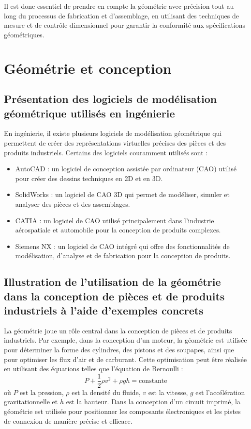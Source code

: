 \documentclass{article}
\begin{document}
Il est donc essentiel de prendre en compte la géométrie avec précision tout au long du processus de fabrication et d'assemblage, en utilisant des techniques de mesure et de contrôle dimensionnel pour garantir la conformité aux spécifications géométriques.




\section{Géométrie et conception}

\subsection{Présentation des logiciels de modélisation géométrique utilisés en ingénierie}
En ingénierie, il existe plusieurs logiciels de modélisation géométrique qui permettent de créer des représentations virtuelles précises des pièces et des produits industriels. Certains des logiciels couramment utilisés sont : 
\begin{itemize}

  \item AutoCAD : un logiciel de conception assistée par ordinateur (CAO) utilisé pour créer des dessins techniques en 2D et en 3D.

  \item SolidWorks : un logiciel de CAO 3D qui permet de modéliser, simuler et analyser des pièces et des assemblages.

  \item CATIA : un logiciel de CAO utilisé principalement dans l'industrie aérospatiale et automobile pour la conception de produits complexes.

  \item Siemens NX : un logiciel de CAO intégré qui offre des fonctionnalités de modélisation, d'analyse et de fabrication pour la conception de produits.
\end{itemize}

\subsection{Illustration de l'utilisation de la géométrie dans la conception de pièces et de produits industriels à l'aide d'exemples concrets}
La géométrie joue un rôle central dans la conception de pièces et de produits industriels. Par exemple, dans la conception d'un moteur, la géométrie est utilisée pour déterminer la forme des cylindres, des pistons et des soupapes, ainsi que pour optimiser les flux d'air et de carburant. Cette optimisation peut être réalisée en utilisant des équations telles que l'équation de Bernoulli :
\[ P + \frac{1}{2} \rho v^2 + \rho gh = \text{constante} \]
où \( P \) est la pression, \( \rho \) est la densité du fluide, \( v \) est la vitesse, \( g \) est l'accélération gravitationnelle et \( h \) est la hauteur. Dans la conception d'un circuit imprimé, la géométrie est utilisée pour positionner les composants électroniques et les pistes de connexion de manière précise et efficace.
\end{document}

